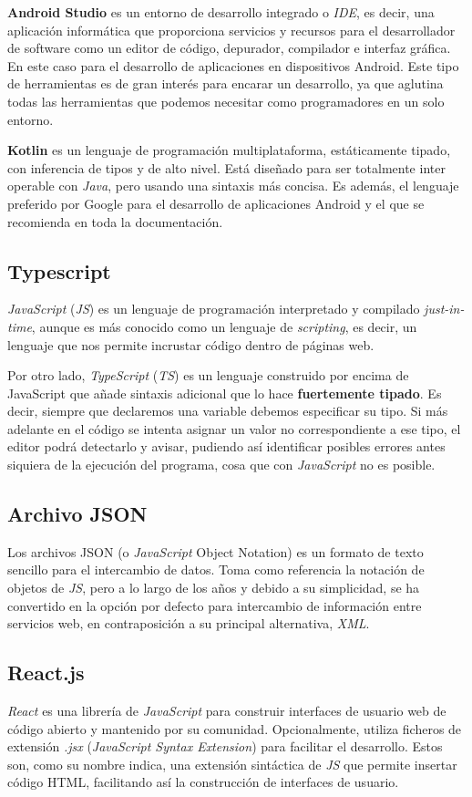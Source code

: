 \textbf{Android Studio} es un entorno de desarrollo integrado o \textit{IDE}, es decir, una aplicación informática que proporciona servicios y recursos para el desarrollador de software como un editor de código, depurador, compilador e interfaz gráfica. En este caso para el desarrollo de aplicaciones en dispositivos Android. Este tipo de herramientas es de gran interés para encarar un desarrollo, ya que aglutina todas las herramientas que podemos necesitar como programadores en un solo entorno.

\textbf{Kotlin}  es un lenguaje de programación multiplataforma, estáticamente tipado, con inferencia de tipos y de alto nivel. Está diseñado para ser totalmente inter operable con \textit{Java}, pero usando una sintaxis más concisa. Es además, el lenguaje preferido por Google para el desarrollo de aplicaciones Android y el que se recomienda en toda la documentación.

\subsection{Typescript}
\textit{JavaScript} (\textit{JS}) es un lenguaje de programación interpretado y compilado \textit{just-in-time}, aunque es más conocido como un lenguaje de \textit{scripting}, es decir, un lenguaje que nos permite incrustar código dentro de páginas web.

Por otro lado, \textit{TypeScript} (\textit{TS}) es un lenguaje construido por encima de JavaScript que añade sintaxis adicional que lo hace \textbf{fuertemente tipado}. Es decir, siempre que declaremos una variable debemos especificar su tipo. Si más adelante en el código se intenta asignar un valor no correspondiente a ese tipo, el editor podrá detectarlo y avisar, pudiendo así identificar posibles errores antes siquiera de la ejecución del programa, cosa que con \textit{JavaScript} no es posible.

\subsection{Archivo JSON}
Los archivos JSON (o \textit{JavaScript} Object Notation) es un formato de texto sencillo para el intercambio de datos. Toma como referencia la notación de objetos de \textit{JS}, pero a lo largo de los años y debido a su simplicidad, se ha convertido en la opción por defecto para intercambio de información entre servicios web, en contraposición a su principal alternativa, \textit{XML}.

\subsection{React.js}
\textit{React} es una librería de \textit{JavaScript} para construir interfaces de usuario web de código abierto y mantenido por su comunidad. Opcionalmente, utiliza ficheros de extensión \textit{.jsx} (\textit{JavaScript Syntax Extension}) para facilitar el desarrollo. Estos son, como su nombre indica, una extensión sintáctica de \textit{JS} que permite insertar código HTML, facilitando así la construcción de interfaces de usuario.

